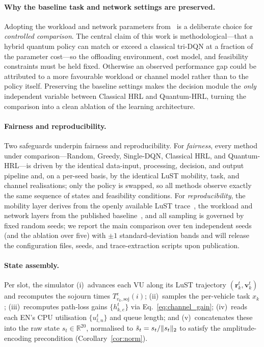 \documentclass[11pt,a4paper]{article}
\theoremstyle{definition}
\newcommand{\R}{\mathbb{R}}
\DeclarePairedDelimiter{\norm}{\lVert}{\rVert}
\begin{document}
\paragraph{Why the baseline task and network settings are preserved.}
Adopting the workload and network parameters from~\cite{hrl_ntn} is a deliberate choice for \emph{controlled comparison}. The central claim of this work is methodological---that a hybrid quantum policy can match or exceed a classical tri-DQN at a fraction of the parameter cost---so the offloading environment, cost model, and feasibility constraints must be held fixed. Otherwise an observed performance gap could be attributed to a more favourable workload or channel model rather than to the policy itself. Preserving the baseline settings makes the decision module the \emph{only} independent variable between Classical HRL and Quantum-HRL, turning the comparison into a clean ablation of the learning architecture.

\paragraph{Fairness and reproducibility.}
Two safeguards underpin fairness and reproducibility. For \emph{fairness}, every method under comparison---Random, Greedy, Single-DQN, Classical HRL, and Quantum-HRL---is driven by the identical data-input, processing, decision, and output pipeline and, on a per-seed basis, by the identical LuST mobility, task, and channel realisations; only the policy is swapped, so all methods observe exactly the same sequence of states and feasibility conditions. For \emph{reproducibility}, the mobility layer derives from the openly available LuST trace~\cite{codeca2015lust}, the workload and network layers from the published baseline~\cite{hrl_ntn}, and all sampling is governed by fixed random seeds; we report the main comparison over ten independent seeds (and the ablation over five) with $\pm1$ standard-deviation bands and will release the configuration files, seeds, and trace-extraction scripts upon publication.

\paragraph{State assembly.}
Per slot, the simulator (i)~advances each VU along its LuST trajectory $(\mathbf{r}_k^t,\mathbf{v}_k^t)$ and recomputes the sojourn times $T_{v_k,\mathrm{soj}}^{e}(i)$; (ii)~samples the per-vehicle task $x_k$; (iii)~recomputes path-loss gains $\{h_{k,e}^t\}$ via Eq.~\eqref{eq:channel_gain}; (iv)~reads each EN's CPU utilisation $\{u_{l,n}^t\}$ and queue length; and (v)~concatenates these into the raw state $s_t\in\R^{20}$, normalised to $\tilde s_t = s_t/\norm{s_t}_2$ to satisfy the amplitude-encoding precondition (Corollary~\ref{cor:norm}).
\end{document}
